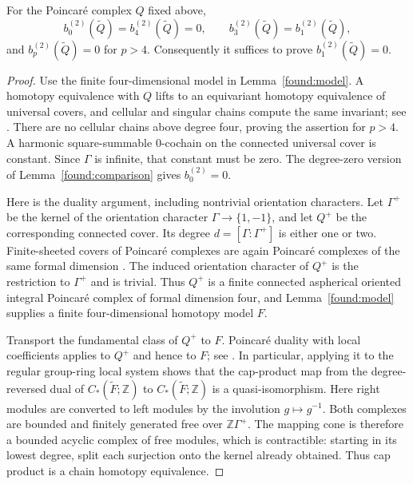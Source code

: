 \begin{lemma}\label{found:reduction}
For the Poincar\'e complex $Q$ fixed above,
\[
 b_0^{(2)}(\widetilde Q)=b_4^{(2)}(\widetilde Q)=0,
 \qquad
 b_3^{(2)}(\widetilde Q)=b_1^{(2)}(\widetilde Q),
\]
and $b_p^{(2)}(\widetilde Q)=0$ for $p>4$.
Consequently it suffices to prove $b_1^{(2)}(\widetilde Q)=0$.
\end{lemma}

\begin{proof}
Use the finite four-dimensional model in Lemma~\ref{found:model}.
A homotopy equivalence with $Q$ lifts to an equivariant homotopy
equivalence of universal covers, and cellular and singular chains
compute the same invariant; see
\cite[Definition~6.50 and Lemmas~6.51--6.53]{Luck2002}.
There are no cellular chains above degree four, proving the assertion
for $p>4$. A harmonic square-summable $0$-cochain on the connected
universal cover is constant. Since $\Gamma$ is infinite, that constant
must be zero. The degree-zero version of
Lemma~\ref{found:comparison} gives $b_0^{(2)}=0$.

Here is the duality argument, including nontrivial orientation
characters. Let $\Gamma^+$ be the kernel of the orientation
character $\Gamma\to\{1,-1\}$, and let $Q^+$ be the corresponding
connected cover. Its degree $d=[\Gamma:\Gamma^+]$ is either one or
two. Finite-sheeted covers of Poincar\'e complexes are again
Poincar\'e complexes of the same formal dimension
\cite[p.~567, paragraph preceding Corollary~4.4]{Stark1996}. The induced orientation
character of $Q^+$ is the restriction to $\Gamma^+$ and is trivial.
Thus $Q^+$ is a finite connected aspherical oriented integral
Poincar\'e complex of formal dimension four, and
Lemma~\ref{found:model} supplies a finite four-dimensional homotopy
model $F$.

Transport the fundamental class of $Q^+$ to $F$.
Poincar\'e duality with local coefficients applies to $Q^+$ and hence
to $F$; see \cite[Lemma~1.1]{Wall1967}.
In particular, applying it to the regular group-ring local system
shows that the cap-product map from the degree-reversed dual of
$C_*(\widetilde F;\mathbb Z)$ to $C_*(\widetilde F;\mathbb Z)$
is a quasi-isomorphism. Here right modules are converted to left
modules by the involution $g\mapsto g^{-1}$.
Both complexes are bounded and finitely generated free over
$\mathbb Z\Gamma^+$. The mapping cone is therefore a bounded
acyclic complex of free modules, which is contractible: starting in
its lowest degree, split each surjection onto the kernel already
obtained. Thus cap product is a chain homotopy equivalence.


\end{proof}
